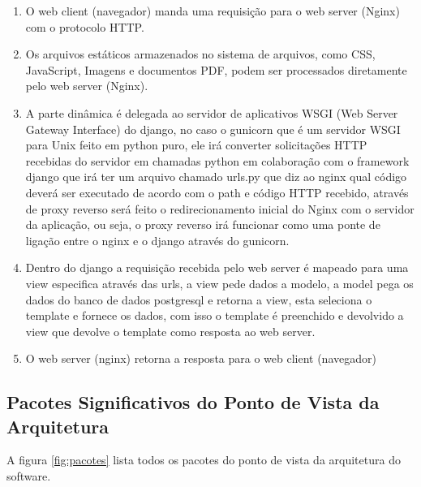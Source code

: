 \begin{enumerate}
  \item O web client (navegador) manda uma requisição para o web server (Nginx) com o protocolo HTTP.
  \item Os arquivos estáticos armazenados no sistema de arquivos, como CSS, JavaScript, Imagens e documentos PDF,
    podem ser processados diretamente pelo web server (Nginx).
  \item A parte dinâmica é delegada ao servidor de aplicativos WSGI (Web Server Gateway Interface) do django, no caso
    o gunicorn que é um servidor WSGI para Unix feito em python puro, ele irá converter solicitações HTTP recebidas
    do servidor em chamadas python em colaboração com o framework django que irá ter um arquivo chamado urls.py que
    diz ao nginx qual código deverá ser executado de acordo com o path e código HTTP recebido, através de proxy
    reverso será feito o redirecionamento inicial do Nginx com o servidor da aplicação, ou seja, o proxy reverso
    irá funcionar como uma ponte de ligação entre o nginx e o django através do gunicorn.
  \item Dentro do django a requisição recebida pelo web server é mapeado para uma view especifica através das urls,
    a view pede dados a modelo, a model pega os dados do banco de dados postgresql e retorna a view, esta seleciona
    o template e fornece os dados, com isso o template é preenchido e devolvido a view que devolve o template como
    resposta ao web server.
  \item O web server (nginx) retorna a resposta para o web client (navegador)
\end{enumerate}

\subsection{Pacotes Significativos do Ponto de Vista da Arquitetura}

A figura \ref{fig:pacotes} lista todos os pacotes do ponto de vista da arquitetura do software.

